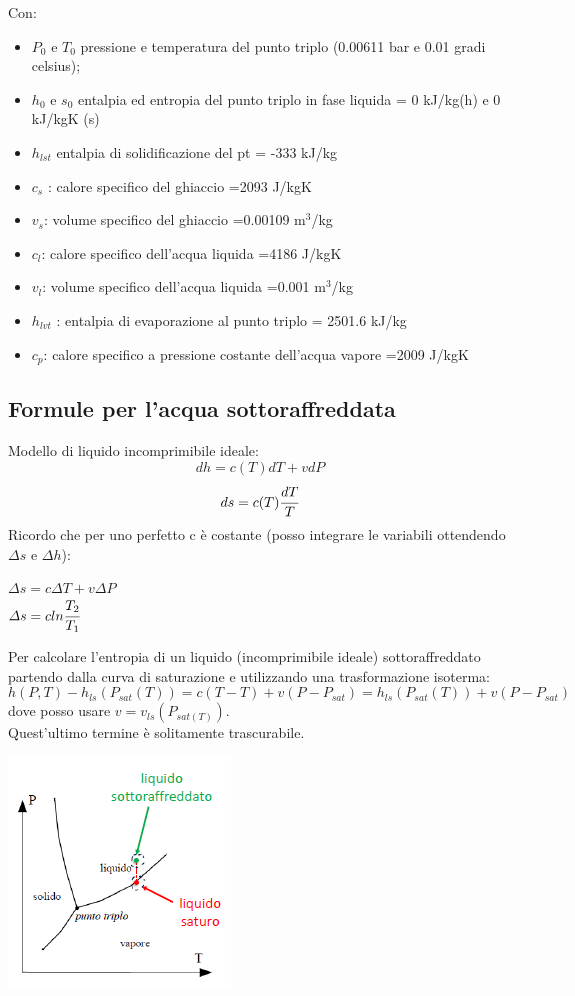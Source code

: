 \documentclass[a4paper,12pt,titlepage]{article}
\begin{document}
Con: 
\begin{itemize}
\item $P_{0}$ e $T_{0}$ pressione e temperatura del punto triplo (0.00611 bar e 0.01 gradi celsius);
\item $h_{0}$ e $s_{0}$ entalpia ed entropia del punto triplo in fase liquida = 0 kJ/kg(h) e 0 kJ/kgK (s)
\item $h_{lst}$ entalpia di solidificazione del pt = -333 kJ/kg
\item $c_{s}$ : calore specifico del ghiaccio =2093 J/kgK
\item $v_{s}$: volume specifico del ghiaccio =0.00109 m$^3$/kg
\item $c_{l}$: calore specifico dell’acqua liquida =4186 J/kgK
\item  $v_{l}$: volume specifico dell’acqua liquida =0.001 m$^3$/kg
\item $h_{lvt}$ : entalpia di evaporazione al punto triplo = 2501.6 kJ/kg
\item $c_{p}$: calore specifico a pressione costante dell’acqua vapore =2009 J/kgK
\end{itemize}

\subsection{Formule per l'acqua sottoraffreddata}
Modello di liquido incomprimibile ideale:
$$dh = c(T)dT+vdP $$
$$ds = c(T)\cfrac{dT}{T}$$
Ricordo che per uno perfetto c è costante (posso integrare le variabili ottendendo $\varDelta s$ e $\varDelta h$):
\begin{center}
$\varDelta s = c\varDelta T + v\varDelta P$\\
$\varDelta s = cln\cfrac{T_{2}}{T_{1}}$
\end{center}
Per calcolare l'entropia di un liquido (incomprimibile ideale) sottoraffreddato partendo dalla curva di saturazione e utilizzando una trasformazione isoterma:
$$h(P,T)-h_{ls}(P_{sat}(T))= c(T-T)+v(P-P_{sat}) = h_{ls}(P_{sat}(T)) +v(P-P_{sat}) $$
dove posso usare $v = v_{ls}(P_{sat(T)})$.\\
Quest'ultimo termine è solitamente trascurabile.
\begin{center}
\includegraphics[scale=0.6]{p_t_liquido_sottoraffreddato}
\end{center}
\end{document}
